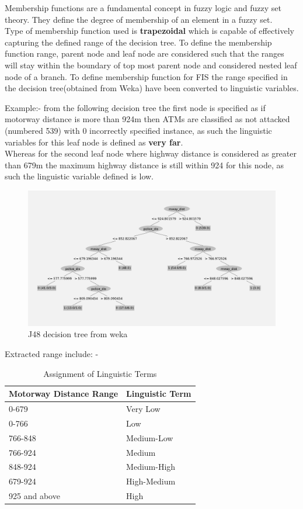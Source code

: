 \documentclass[10pt, conference, compsocconf]{IEEEtran}
\begin{document}
		Membership functions are a fundamental concept in fuzzy logic and fuzzy set theory. They define the degree of membership of an element in a fuzzy set.\\
		
		Type of membership function used is \textbf{trapezoidal} which is capable of effectively capturing the defined range of the decision tree.
		To define the membership function range, parent node and leaf node are considered such that the ranges will stay within the boundary of top most parent node and considered nested leaf node of a branch. To define membership function for FIS the range specified in the decision tree(obtained from Weka) have been converted to linguistic variables.
		
		Example:- from the following decision tree the first node is specified as if motorway distance is more than 924m then ATMs are classified as not attacked (numbered 539) with 0 incorrectly specified instance, as such the linguistic variables for this leaf node is defined as \textbf{very far}.\\
		Whereas for the second leaf node where highway distance is considered as greater than 679m the maximum highway distance is still within 924 for this node, as such the linguistic variable defined is low.
			\begin{figure}[h!]
			\centering
			\includegraphics[width=\linewidth]{Decisiontree.png}
			\caption{J48 decision tree from weka}
			\label{dt}
		   \end{figure}
	
	    Extracted range include: -
\begin{table}[htbp]
	\centering
	\caption{Assignment of Linguistic Terms}
	\begin{tabular}{|l|l|}
		\hline
		\textbf{Motorway Distance Range} & \textbf{Linguistic Term} \\
		\hline
		0-679 & Very Low \\
		\hline
		0-766 & Low \\
		\hline
		766-848 & Medium-Low \\
		\hline
		766-924 & Medium \\
		\hline
		848-924 & Medium-High \\
		\hline
		679-924 & High-Medium \\
		\hline
		925 and above & High \\
		\hline
	\end{tabular}
	\label{tab:linguistic_terms}
\end{table}
\end{document}
